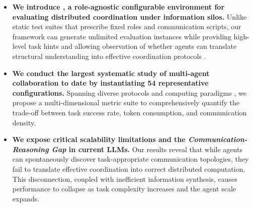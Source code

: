 \begin{itemize}[leftmargin=*]
\item \textbf{We introduce \silobench{}, a role-agnostic configurable environment for evaluating distributed coordination under information silos.} 
Unlike static test suites that prescribe fixed roles and communication scripts, our framework can generate unlimited evaluation instances while providing high-level task hints and allowing observation of whether agents can translate structural understanding into effective coordination protocols \cite{presstrain,liuagentbench}. 
\item \textbf{We conduct the largest systematic study of multi-agent collaboration to date by instantiating 54 representative configurations.} 
Spanning diverse protocols and computing paradigms \citep{zhao2024electoral, islam2024mapcoder}, we propose a multi-dimensional metric suite to comprehensively quantify the trade-off between task success rate, token consumption, and communication density.
\item \textbf{We expose critical scalability limitations and the \emph{Communication-Reasoning Gap} in current LLMs.} 
Our results reveal that while agents can spontaneously discover task-appropriate communication topologies, they fail to translate effective coordination into correct distributed computation. 
This disconnection, coupled with inefficient information synthesis, causes performance to collapse as task complexity increases and the agent scale expands.
\end{itemize}
